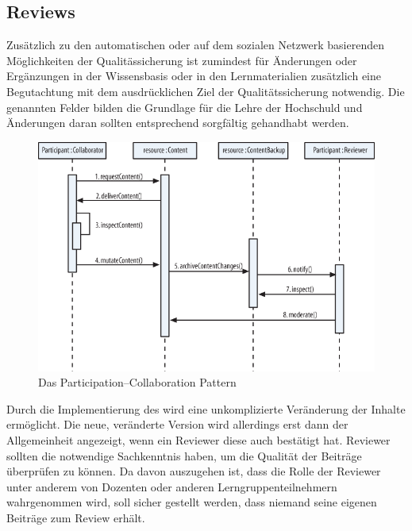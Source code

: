 \subsection{Reviews} %
Zusätzlich zu den automatischen oder auf dem sozialen Netzwerk basierenden Möglichkeiten der Qualitässicherung ist zumindest für Änderungen oder Ergänzungen in der Wissensbasis oder in den Lernmaterialien zusätzlich eine Begutachtung mit dem ausdrücklichen Ziel der Qualitätssicherung notwendig. Die genannten Felder bilden die Grundlage für die Lehre der Hochschuld und Änderungen daran sollten entsprechend sorgfältig gehandhabt werden.

\label{sub:reviews}
\begin{figure}[H]
\begin{center}
\includegraphics[width=\textwidth]{partcollpat.png}
\caption[Das Participation–Collaboration Pattern]{Das Participation–Collaboration Pattern\footnotemark}
\label{fig:partcolpat}
\end{center}
\end{figure}

Durch die Implementierung des  wird eine unkomplizierte Veränderung der Inhalte ermöglicht. Die neue, veränderte Version wird allerdings erst dann der Allgemeinheit angezeigt, wenn ein Reviewer diese auch bestätigt hat. Reviewer sollten die notwendige Sachkenntnis haben, um die Qualität der Beiträge überprüfen zu können.  Da davon auszugehen ist, dass die Rolle der Reviewer unter anderem von Dozenten oder anderen Lerngruppenteilnehmern wahrgenommen wird, soll sicher gestellt werden, dass niemand seine eigenen Beiträge zum Review erhält.

